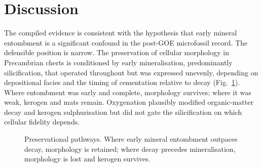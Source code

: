 \documentclass[11pt]{article}
\begin{document}
\section{Discussion}

The compiled evidence is consistent with the hypothesis that early mineral entombment is a
significant confound in the post-GOE microfossil record. The defensible position is narrow. The
preservation of cellular morphology in Precambrian cherts is conditioned by early mineralisation,
predominantly silicification, that operated throughout but was expressed unevenly, depending on
depositional facies and the timing of cementation relative to decay (Fig.~\ref{fig:model}). Where
entombment was early and complete, morphology survives; where it was weak, kerogen and mats remain.
Oxygenation plausibly modified organic-matter decay and kerogen sulphurisation
\citep{Lepot2009,Decraene2021} but did not gate the silicification on which cellular fidelity depends.

\begin{figure}[t]
\centering
{}
\caption{Preservational pathways. Where early mineral entombment outpaces decay, morphology is
retained; where decay precedes mineralisation, morphology is lost and kerogen survives.}
\label{fig:model}
\end{figure}
\end{document}
